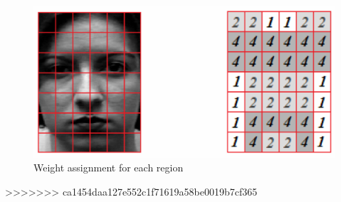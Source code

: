 \begin{figure}[!h]
\begin{center}
\noindent \includegraphics[scale=0.5]{figures/lbp_region_weight} 
\newline
\caption{Weight assignment for each region}
\label{lbp_region_weight}
\end{center} 
\end{figure}
>>>>>>> ca1454daa127e552c1f71619a58be0019b7cf365
